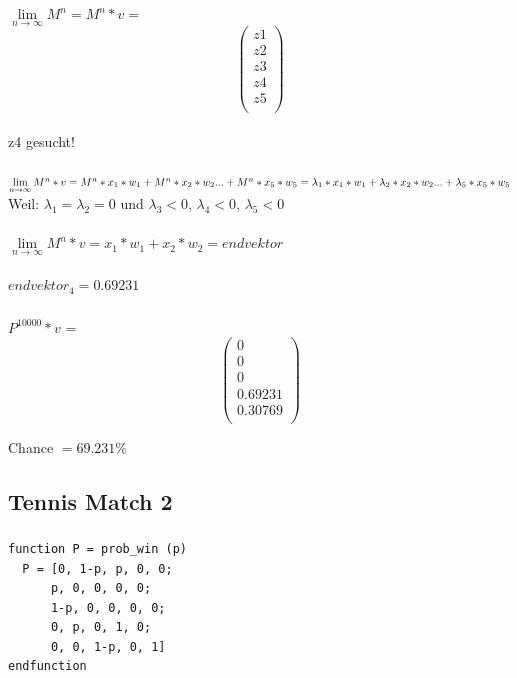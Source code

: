 \documentclass{article}
\begin{document}
$\lim\limits_{n \rightarrow \infty}{M^n} = M^n * v =$ \[
  \begin{pmatrix}
    z1 \\
    z2 \\
    z3 \\
    z4 \\
    z5 \\
  \end{pmatrix}
\]
\\
z4 gesucht! \\ \\
\vspace{5mm}
$\lim\limits_{n \rightarrow \infty}{M^n * v} = M^n * x_1 * w_1 + M^n * x_2 * w_2 ... + M^n * x_5 * w_5 \\
= \lambda_1 * x_1 * w_1 + \lambda_2 * x_2 * w_2 ... + \lambda_5* x_5 * w_5 \\$
\vspace{5mm} \\
Weil: $\lambda_1 = \lambda_2 = 0$ und  $\lambda_3 < 0$, $\lambda_4 < 0$, $\lambda_5 < 0$\\
\vspace{5mm} \\
$\lim\limits_{n \rightarrow \infty}{M^n * v} = x_1 * w_1  + x_2 * w_2 = endvektor$ \\
 \\
$endvektor_4 = 0.69231$


\subsubsection{}
$P^{10000} * v$ = \[
  \begin{pmatrix}
    0 \\
    0 \\
    0 \\
    0.69231 \\
    0.30769 \\
    
  \end{pmatrix}
\]

Chance $= 69.231 \%$


\subsection{Tennis Match 2}
\subsubsection{}
\begin{lstlisting}
function P = prob_win (p)
  P = [0, 1-p, p, 0, 0;
      p, 0, 0, 0, 0;
      1-p, 0, 0, 0, 0;
      0, p, 0, 1, 0;
      0, 0, 1-p, 0, 1]
endfunction
\end{lstlisting}
\end{document}
